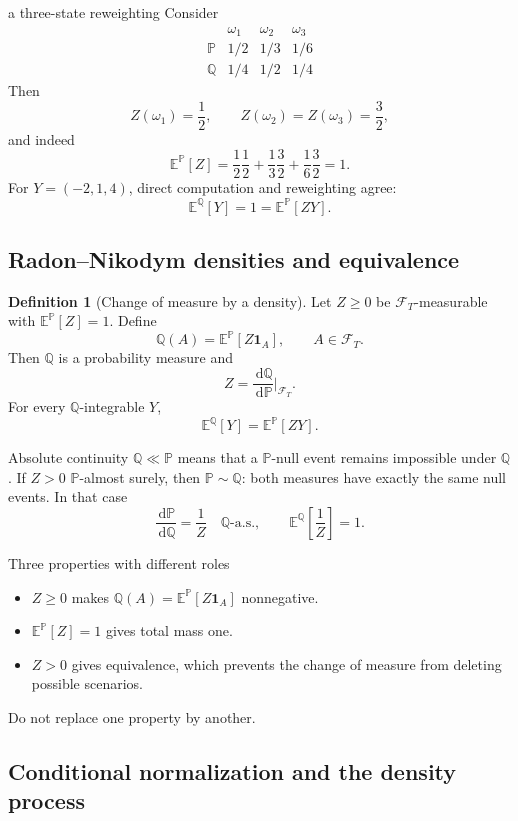\documentclass[10pt]{article}
\newcommand{\E}{\mathbb E}
\newcommand{\Pp}{\mathbb P}
\newcommand{\Q}{\mathbb Q}
\newcommand{\1}{\mathbf 1}
\newcommand{\cF}{\mathcal F}
\newcommand{\dd}{\,\mathrm d}
\theoremstyle{definition}
\newtheorem{definition}{Definition}[section]
\begin{document}
\begin{boardexample}{a three-state reweighting}
Consider
\[
\begin{array}{c|ccc}
 & \omega_1 & \omega_2 & \omega_3\\ \hline
\Pp & 1/2 & 1/3 & 1/6\\
\Q  & 1/4 & 1/2 & 1/4
\end{array}
\]
Then
\[
Z(\omega_1)=\frac12,
\qquad
Z(\omega_2)=Z(\omega_3)=\frac32,
\]
and indeed
\[
\E^{\Pp}[Z]
=\frac12\frac12+\frac13\frac32+\frac16\frac32=1.
\]
For \(Y=(-2,1,4)\), direct computation and reweighting agree:
\[
\E^{\Q}[Y]=1=\E^{\Pp}[ZY].
\]
\end{boardexample}

\subsection{Radon--Nikodym densities and equivalence}

\begin{definition}[Change of measure by a density]
Let \(Z\geq0\) be \(\cF_T\)-measurable with \(\E^{\Pp}[Z]=1\). Define
\[
\Q(A)=\E^{\Pp}[Z\1_A],
\qquad A\in\cF_T.
\]
Then \(\Q\) is a probability measure and
\[
Z=\frac{\dd\Q}{\dd\Pp}\bigg|_{\cF_T}.
\]
For every \(\Q\)-integrable \(Y\),
\[
\boxed{\E^{\Q}[Y]=\E^{\Pp}[ZY].}
\]
\end{definition}

Absolute continuity \(\Q\ll\Pp\) means that a \(\Pp\)-null event remains
impossible under \(\Q\). If \(Z>0\) \(\Pp\)-almost surely, then
\(\Pp\sim\Q\): both measures have exactly the same null events. In that case
\[
\frac{\dd\Pp}{\dd\Q}=\frac1Z
\quad\Q\text{-a.s.},
\qquad
\E^{\Q}\!\left[\frac1Z\right]=1.
\]

\begin{warningbox}{Three properties with different roles}
\begin{itemize}
  \item \(Z\geq0\) makes \(\Q(A)=\E^{\Pp}[Z\1_A]\) nonnegative.
  \item \(\E^{\Pp}[Z]=1\) gives total mass one.
  \item \(Z>0\) gives equivalence, which prevents the change of measure from
        deleting possible scenarios.
\end{itemize}
Do not replace one property by another.
\end{warningbox}

\subsection{Conditional normalization and the density process}
\end{document}

